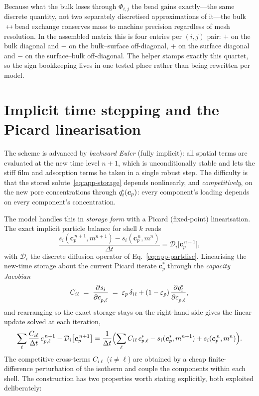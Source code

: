 Because what the bulk loses through $\Phi_{i,j}$ the bead gains exactly---the same
discrete quantity, not two separately discretised approximations of it---the
bulk$\leftrightarrow$bead exchange conserves mass to machine precision regardless
of mesh resolution. In the assembled matrix this is four entries per
$(i,j)$ pair: $+$ on the bulk diagonal and $-$ on the bulk--surface off-diagonal,
$+$ on the surface diagonal and $-$ on the surface--bulk off-diagonal. The helper
 stamps exactly this quartet, so the sign
bookkeeping lives in one tested place rather than being rewritten per model.

\section{Implicit time stepping and the Picard linearisation}
\label{app:grm-time}

The scheme is advanced by \emph{backward Euler} (fully implicit): all spatial
terms are evaluated at the new time level $n+1$, which is unconditionally stable
and lets the stiff film and adsorption terms be taken in a single robust step. The
difficulty is that the stored solute~\eqref{eq:app-storage} depends nonlinearly,
and \emph{competitively}, on the new pore concentrations through
$q^{\!*}_i(\bm c_p)$: every component's loading depends on every component's
concentration.

The model handles this in \emph{storage form} with a Picard (fixed-point)
linearisation. The exact implicit particle balance for shell $k$ reads
%
\begin{equation}
\frac{s_i(\bm c_p^{\,n+1}, m^{n+1}) - s_i(\bm c_p^{\,n}, m^{n})}{\Delta t}
  = \mathcal{D}_i\bigl[\bm c_p^{\,n+1}\bigr],
\label{eq:app-implicit}
\end{equation}
%
with $\mathcal{D}_i$ the discrete diffusion operator of
Eq.~\eqref{eq:app-partdisc}. Linearising the new-time storage about the current
Picard iterate $\bm c_p^{*}$ through the \emph{capacity Jacobian}
%
\begin{equation}
C_{i\ell} \;=\; \frac{\partial^{} s_i}{\partial c_{p,\ell}^{}}
  \;=\; \varepsilon_p\,\delta_{i\ell} + (1-\varepsilon_p)\,\frac{\partial^{} q^{\!*}_i}{\partial c_{p,\ell}^{}},
\label{eq:app-capacity}
\end{equation}
%
and rearranging so the exact storage stays on the right-hand side gives the linear
update solved at each iteration,
%
\begin{equation}
\sum_\ell \frac{C_{i\ell}}{\Delta t}\,c_{p,\ell}^{\,n+1} - \mathcal{D}_i\bigl[\bm c_p^{\,n+1}\bigr]
  = \frac{1}{\Delta t}\Bigl(\sum_\ell C_{i\ell}\,c_{p,\ell}^{*}
        - s_i(\bm c_p^{*}, m^{n+1}) + s_i(\bm c_p^{\,n}, m^{n})\Bigr).
\label{eq:app-picard}
\end{equation}
%
The competitive cross-terms $C_{i\ell}$ ($i\neq\ell$) are obtained by a cheap
finite-difference perturbation of the isotherm and couple the components within
each shell. The construction has two properties worth stating explicitly, both
exploited deliberately:

